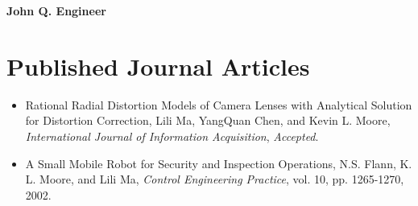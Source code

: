 %
%
%
%

\begin{vita}

\begin{center}
{\Large \bf John Q. Engineer}\\
\end{center}

\section*{Published Journal Articles}
    \begin{itemize}
    \item Rational Radial Distortion Models of Camera Lenses with Analytical Solution for Distortion Correction, Lili
    Ma, YangQuan Chen, and Kevin L. Moore, {\it International Journal of Information Acquisition}, {\it Accepted}.

    \item A Small Mobile Robot for Security and Inspection Operations, N.S. Flann, K. L. Moore, and Lili Ma, {\it Control Engineering Practice}, vol. 10, pp. 1265-1270,
    2002.
    \end{itemize}


\end{vita}
